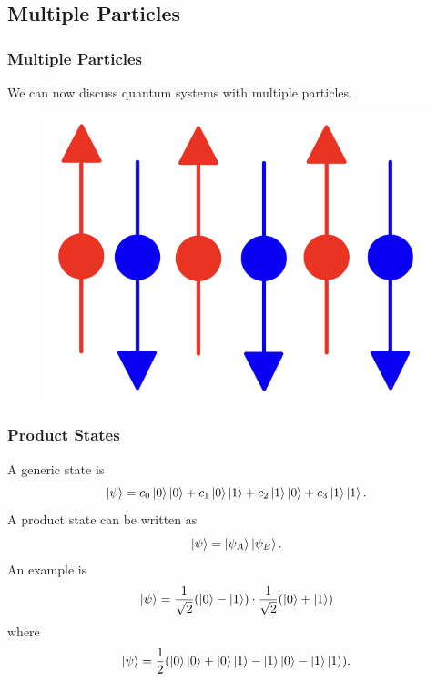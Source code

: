 \documentclass{beamer}
\begin{document}
\subsection{\tiny{Multiple Particles}}
\begin{frame}
\frametitle{Multiple Particles}
We can now discuss quantum systems with multiple particles.
\begin{figure}
\begin{center}
\includegraphics[width=0.75\linewidth]{Spin-12-System.jpg}
\end{center}
\end{figure}
\end{frame}
\begin{frame}
\frametitle{Product States}
A generic state is
\begin{equation}\label{eq:14}
\ket{\psi}=c_0\ket{0}\ket{0}+c_1\ket{0}\ket{1}+c_2\ket{1}\ket{0}+c_3\ket{1}\ket{1}.
\end{equation}
A product state can be written as
\begin{equation}\label{eq:15}
\ket{\psi}=\ket{\psi_A}\ket{\psi_B}.
\end{equation}
An example is
\begin{equation}\label{eq:16}
\ket{\psi}=\frac{1}{\sqrt{2}}(\ket{0}-\ket{1})\cdot\frac{1}{\sqrt{2}}(\ket{0}+\ket{1})
\end{equation}
where
\begin{equation}\label{eq:17}
\ket{\psi}=\frac{1}{2}(\ket{0}\ket{0}+\ket{0}\ket{1}-\ket{1}\ket{0}-\ket{1}\ket{1}).
\end{equation}
\end{frame}
\end{document}
